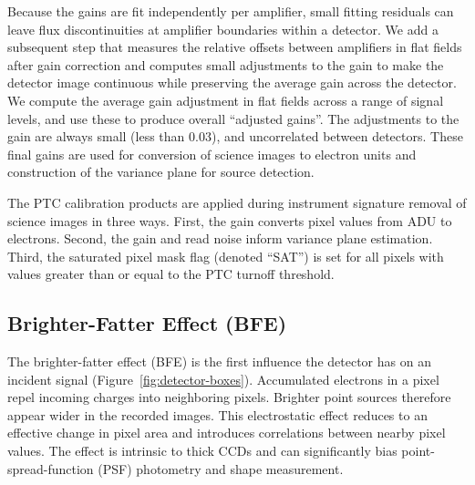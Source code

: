 Because the gains are fit independently per amplifier, small fitting residuals can leave flux discontinuities at amplifier boundaries within a detector.
We add a subsequent step that measures the relative offsets between amplifiers in flat fields after gain correction and computes small adjustments to the gain to make the detector image continuous while preserving the average gain across the detector.
We compute the average gain adjustment in flat fields across a range of signal levels, and use these to produce overall ``adjusted gains''.
The adjustments to the gain are always small (less than 0.03), and uncorrelated between detectors.
These final gains are used for conversion of science images to electron units and construction of the variance plane for source detection.

The PTC calibration products are applied during instrument signature removal of science images in three ways.
First, the gain converts pixel values from ADU to electrons.
Second, the gain and read noise inform variance plane estimation.
Third, the saturated pixel mask flag (denoted ``SAT'') is set for all pixels with values greater than or equal to the PTC turnoff threshold.



\subsection{Brighter-Fatter Effect (BFE)} \label{sec:processing:calibration:bf}

The brighter-fatter effect (BFE) is the first influence the detector has on an incident signal (Figure~\ref{fig:detector-boxes}).
Accumulated electrons in a pixel repel incoming charges into neighboring pixels.
Brighter point sources therefore appear wider in the recorded images.
This electrostatic effect reduces to an effective change in pixel area and introduces correlations between nearby pixel values.
The effect is intrinsic to thick CCDs and can significantly bias point-spread-function (PSF) photometry and shape measurement.

